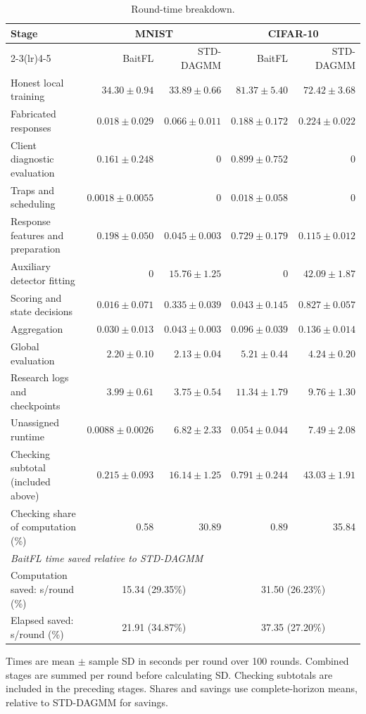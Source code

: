 \begin{table}[t]\centering\footnotesize\setlength{\tabcolsep}{4pt}
\caption{Round-time breakdown.}\label{tab:std-segments}
\begin{tabular}{lrrrr}\toprule
\multirow{2}{*}{Stage} & \multicolumn{2}{c}{MNIST} & \multicolumn{2}{c}{CIFAR-10} \\
\cmidrule(lr){2-3}\cmidrule(lr){4-5}
 & BaitFL & STD-DAGMM & BaitFL & STD-DAGMM \\ \midrule
Honest local training & $34.30 \pm 0.94$ & $33.89 \pm 0.66$ & $81.37 \pm 5.40$ & $72.42 \pm 3.68$ \\
Fabricated responses & $0.018 \pm 0.029$ & $0.066 \pm 0.011$ & $0.188 \pm 0.172$ & $0.224 \pm 0.022$ \\
Client diagnostic evaluation & $0.161 \pm 0.248$ & $0$ & $0.899 \pm 0.752$ & $0$ \\
Traps and scheduling & $0.0018 \pm 0.0055$ & $0$ & $0.018 \pm 0.058$ & $0$ \\
Response features and preparation & $0.198 \pm 0.050$ & $0.045 \pm 0.003$ & $0.729 \pm 0.179$ & $0.115 \pm 0.012$ \\
Auxiliary detector fitting & $0$ & $15.76 \pm 1.25$ & $0$ & $42.09 \pm 1.87$ \\
Scoring and state decisions & $0.016 \pm 0.071$ & $0.335 \pm 0.039$ & $0.043 \pm 0.145$ & $0.827 \pm 0.057$ \\
Aggregation & $0.030 \pm 0.013$ & $0.043 \pm 0.003$ & $0.096 \pm 0.039$ & $0.136 \pm 0.014$ \\
Global evaluation & $2.20 \pm 0.10$ & $2.13 \pm 0.04$ & $5.21 \pm 0.44$ & $4.24 \pm 0.20$ \\
\midrule
Research logs and checkpoints & $3.99 \pm 0.61$ & $3.75 \pm 0.54$ & $11.34 \pm 1.79$ & $9.76 \pm 1.30$ \\
Unassigned runtime & $0.0088 \pm 0.0026$ & $6.82 \pm 2.33$ & $0.054 \pm 0.044$ & $7.49 \pm 2.08$ \\
\midrule
Checking subtotal (included above) & $0.215 \pm 0.093$ & $16.14 \pm 1.25$ & $0.791 \pm 0.244$ & $43.03 \pm 1.91$ \\
Checking share of computation (\%) & 0.58 & 30.89 & 0.89 & 35.84 \\
\midrule
\multicolumn{5}{l}{\textit{BaitFL time saved relative to STD-DAGMM}} \\
Computation saved: s/round (\%) & \multicolumn{2}{c}{15.34 (29.35\%)} & \multicolumn{2}{c}{31.50 (26.23\%)} \\
Elapsed saved: s/round (\%) & \multicolumn{2}{c}{21.91 (34.87\%)} & \multicolumn{2}{c}{37.35 (27.20\%)} \\
\bottomrule\end{tabular}
\par\smallskip\parbox{0.94\textwidth}{\scriptsize Times are mean $\pm$ sample SD in seconds per round over 100 rounds. Combined stages are summed per round before calculating SD. Checking subtotals are included in the preceding stages. Shares and savings use complete-horizon means, relative to STD-DAGMM for savings.}
\end{table}
